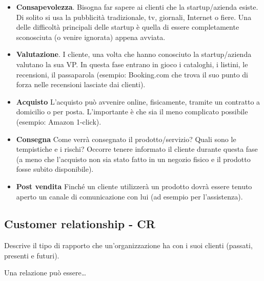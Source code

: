 \begin{itemize}

\item \textbf{Consapevolezza}. Bisogna far sapere ai clienti che la
startup/azienda esiste. Di solito si usa la pubblicità tradizionale, tv,
giornali, Internet o fiere. Una delle difficoltà principali delle startup
è quella di essere completamente sconosciuta (o venire ignorata) appena
avviata.

\item \textbf{Valutazione}. I cliente, una volta che hanno conosciuto la
startup/azienda valutano la sua VP. In questa fase entrano in gioco i
cataloghi, i listini, le recensioni, il passaparola (esempio: Booking.com
che trova il suo punto di forza nelle recensioni lasciate dai clienti).

\item \textbf{Acquisto} L'acquisto può avvenire online, fisicamente, tramite
un contratto a domicilio o per posta. L'importante è che sia il meno complicato
possibile (esempio: Amazon 1-click).

\item \textbf{Consegna} Come verrà consegnato il prodotto/servizio? Quali sono
le tempistiche e i rischi? Occorre tenere informato il cliente durante questa
fase (a meno che l'acquisto non sia stato fatto in un negozio fisico e il
prodotto fosse subito disponibile).

\item \textbf{Post vendita} Finché un cliente utilizzerà un prodotto dovrà
essere tenuto aperto un canale di comunicazione con lui (ad esempio per
l'assistenza).

\end{itemize}

\subsection{Customer relationship - CR}

Descrive il tipo di rapporto che un'organizzazione ha con i suoi clienti
(passati, presenti e futuri).

Una relazione può essere\dots

